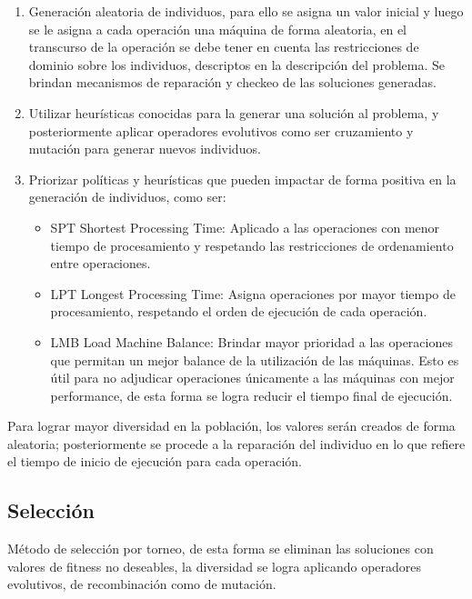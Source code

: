 \documentclass[journal]{IEEEtran}
\begin{document}
\begin{enumerate}
    \item Generación aleatoria de individuos, para ello se asigna un valor inicial y luego se le asigna a cada operación una máquina de forma aleatoria, en el transcurso de la operación se debe tener en cuenta las restricciones de dominio sobre los individuos, descriptos en la descripción del problema. Se brindan mecanismos de reparación y checkeo de las soluciones generadas.
  \item Utilizar heurísticas conocidas para la generar una solución al problema, y posteriormente aplicar operadores evolutivos como ser cruzamiento y mutación para generar nuevos individuos.
  \item Priorizar políticas y heurísticas que pueden impactar de forma positiva en la generación de individuos, como ser:
  \begin{itemize}
    \item SPT Shortest Processing Time: Aplicado a las operaciones con menor tiempo de procesamiento y respetando las restricciones de ordenamiento entre operaciones.
    \item LPT Longest Processing Time: Asigna operaciones por mayor tiempo de procesamiento, respetando el orden de ejecución de cada operación.
    \item LMB Load Machine Balance: Brindar mayor prioridad a las operaciones que permitan un mejor balance de la utilización de las máquinas. Esto es útil para no adjudicar operaciones únicamente a las máquinas con mejor performance, de esta forma se logra reducir el tiempo final de ejecución.
  \end{itemize}
\end{enumerate}
Para lograr mayor diversidad en la población, los valores serán creados de forma aleatoria; posteriormente se procede a la reparación del individuo en lo que refiere el tiempo de inicio de ejecución para cada operación.


\subsection{Selección}
Método de selección por torneo, de esta forma se eliminan las soluciones con valores de fitness no deseables, la diversidad se logra aplicando operadores evolutivos, de recombinación como de mutación. 
\end{document}
